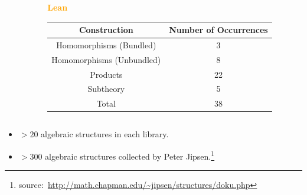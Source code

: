 \documentclass[t,10pt,numbers,fleqn,usenames,xcolor=dvipsnames]{beamer}
\begin{document}
\begin{frame}[fragile]
\begin{columns}
\begin{column}{0.45\textwidth}
\end{column} 
\begin{column}{0.45\textwidth}
\textcolor{Orange}{\textbf{Lean}}
\begin{table}
\begin{adjustbox}{width=0.9\columnwidth}
\begin{tabular}{| c || c |}
\hline 
\textbf{Construction} & \textbf{Number of Occurrences} \\ \hline 
Homomorphisms (Bundled) & 3 \\ \hline
Homomorphisms (Unbundled)& 8  \\ \hline
Products & 22 \\ \hline
Subtheory & 5 \\ \hline\hline 
Total & 38 \\ \hline 
\end{tabular}
\end{adjustbox}
\end{table} 
\end{column} 
\end{columns}
\begin{itemize}
\item $> 20$ algebraic structures in each library.
\pause  
\item $>300$ algebraic structures collected by Peter Jipsen.\only<+->\footnote{source:~\url{http://math.chapman.edu/~jipsen/structures/doku.php}}
\end{itemize}
\end{frame}
\end{document}

